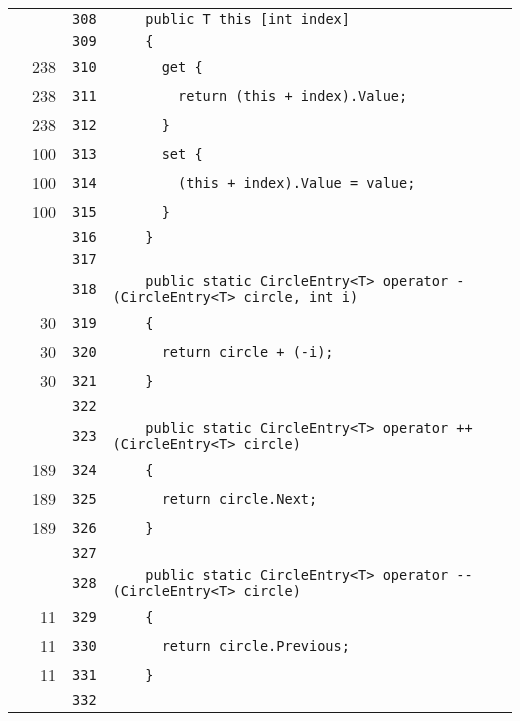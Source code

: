 \documentclass[a4paper,10pt]{article}
\begin{document}
\begin{longtable}[l]{lrrl}
\cellcolor{gray} &  & \verb~308~ & \verb~    public T this [int index]~\\
\cellcolor{gray} &  & \verb~309~ & \verb~    {~\\
\cellcolor{green} & 238 & \verb~310~ & \verb~      get {~\\
\cellcolor{green} & 238 & \verb~311~ & \verb~        return (this + index).Value;~\\
\cellcolor{green} & 238 & \verb~312~ & \verb~      }~\\
\cellcolor{green} & 100 & \verb~313~ & \verb~      set {~\\
\cellcolor{green} & 100 & \verb~314~ & \verb~        (this + index).Value = value;~\\
\cellcolor{green} & 100 & \verb~315~ & \verb~      }~\\
\cellcolor{gray} &  & \verb~316~ & \verb~    }~\\
\cellcolor{gray} &  & \verb~317~ & \verb~~\\
\cellcolor{gray} &  & \verb~318~ & \verb~    public static CircleEntry<T> operator - (CircleEntry<T> circle, int i)~\\
\cellcolor{green} & 30 & \verb~319~ & \verb~    {~\\
\cellcolor{green} & 30 & \verb~320~ & \verb~      return circle + (-i);~\\
\cellcolor{green} & 30 & \verb~321~ & \verb~    }~\\
\cellcolor{gray} &  & \verb~322~ & \verb~~\\
\cellcolor{gray} &  & \verb~323~ & \verb~    public static CircleEntry<T> operator ++ (CircleEntry<T> circle)~\\
\cellcolor{green} & 189 & \verb~324~ & \verb~    {~\\
\cellcolor{green} & 189 & \verb~325~ & \verb~      return circle.Next;~\\
\cellcolor{green} & 189 & \verb~326~ & \verb~    }~\\
\cellcolor{gray} &  & \verb~327~ & \verb~~\\
\cellcolor{gray} &  & \verb~328~ & \verb~    public static CircleEntry<T> operator -- (CircleEntry<T> circle)~\\
\cellcolor{green} & 11 & \verb~329~ & \verb~    {~\\
\cellcolor{green} & 11 & \verb~330~ & \verb~      return circle.Previous;~\\
\cellcolor{green} & 11 & \verb~331~ & \verb~    }~\\
\cellcolor{gray} &  & \verb~332~ & \verb~~\\

\end{longtable}
\end{document}
